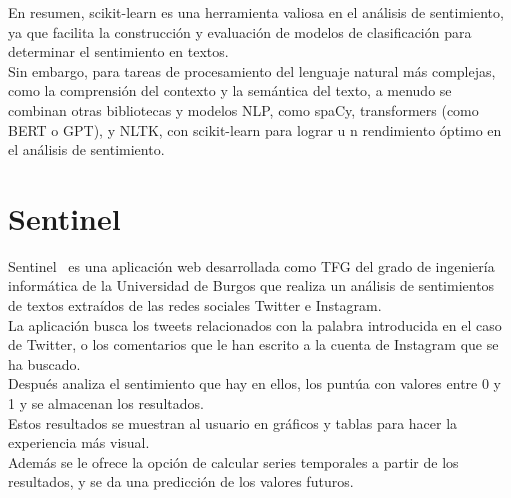 En resumen, scikit-learn es una herramienta valiosa en el análisis de sentimiento, 
ya que facilita la construcción y evaluación de modelos de clasificación 
para determinar el sentimiento en textos.\\ 
Sin embargo, para tareas de procesamiento del lenguaje natural 
más complejas, como la comprensión del contexto y la semántica del texto, 
a menudo se combinan otras bibliotecas y modelos NLP, como spaCy, 
transformers (como BERT o GPT), y NLTK, con scikit-learn para lograr u
n rendimiento óptimo en el análisis de sentimiento.


\section{Sentinel}
Sentinel~\cite{Sentinel1} es una aplicación web desarrollada como TFG del grado de ingeniería 
informática de la Universidad de Burgos que realiza un análisis de sentimientos de textos 
extraídos de las redes sociales Twitter e Instagram.\\
La aplicación busca los tweets relacionados con la palabra introducida 
en el caso de Twitter, o los comentarios que le han escrito a la 
cuenta de Instagram que se ha buscado.\\
Después analiza el sentimiento que hay en ellos, los puntúa con valores entre 0 y 1 y 
se almacenan los resultados.\\
Estos resultados se muestran al usuario en gráficos 
y tablas para hacer la experiencia más visual.\\ 
Además se le ofrece la opción de calcular series temporales a partir de los resultados, 
y se da una predicción de los valores futuros.



